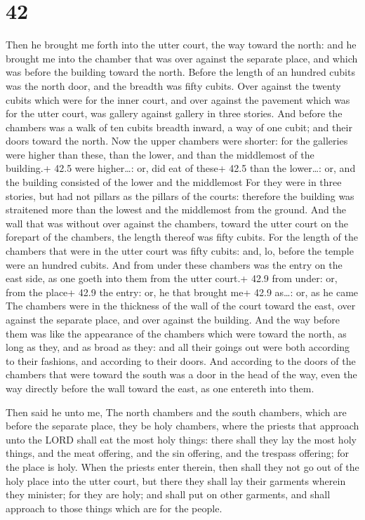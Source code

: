 \hypertarget{section-41}{%
\section{42}\label{section-41}}

 Then he brought me forth into the utter court, the way
toward the north: and he brought me into the chamber that was over
against the separate place, and which was before the building toward the
north.  Before the length of an hundred cubits was the north
door, and the breadth was fifty cubits.  Over against the
twenty cubits which were for the inner court, and over against the
pavement which was for the utter court, was gallery against gallery in
three stories.  And before the chambers was a walk of ten
cubits breadth inward, a way of one cubit; and their doors toward the
north.  Now the upper chambers were shorter: for the
galleries were higher than these, than the lower, and than the
middlemost of the building.+ 42.5 were higher\ldots: or, did eat of
these+ 42.5 than the lower\ldots: or, and the building consisted of the
lower and the middlemost  For they were in three stories,
but had not pillars as the pillars of the courts: therefore the building
was straitened more than the lowest and the middlemost from the ground.
 And the wall that was without over against the chambers,
toward the utter court on the forepart of the chambers, the length
thereof was fifty cubits.  For the length of the chambers
that were in the utter court was fifty cubits: and, lo, before the
temple were an hundred cubits.  And from under these
chambers was the entry on the east side, as one goeth into them from the
utter court.+ 42.9 from under: or, from the place+ 42.9 the entry: or,
he that brought me+ 42.9 as\ldots: or, as he came  The
chambers were in the thickness of the wall of the court toward the east,
over against the separate place, and over against the building.
 And the way before them was like the appearance of the
chambers which were toward the north, as long as they, and as broad as
they: and all their goings out were both according to their fashions,
and according to their doors.  And according to the doors
of the chambers that were toward the south was a door in the head of the
way, even the way directly before the wall toward the east, as one
entereth into them.

 Then said he unto me, The north chambers and the south
chambers, which are before the separate place, they be holy chambers,
where the priests that approach unto the LORD shall eat the most holy
things: there shall they lay the most holy things, and the meat
offering, and the sin offering, and the trespass offering; for the place
is holy.  When the priests enter therein, then shall they
not go out of the holy place into the utter court, but there they shall
lay their garments wherein they minister; for they are holy; and shall
put on other garments, and shall approach to those things which are for
the people.

